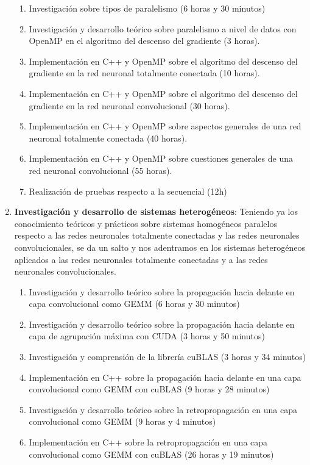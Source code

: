 \begin{enumerate}[label=\textbullet]
	\begin{enumerate}[label=\textbullet]
		\item Investigación sobre tipos de paralelismo (6 horas y 30 minutos)
		\item Investigación y desarrollo teórico sobre paralelismo a nivel de datos con OpenMP en el algoritmo del descenso del gradiente (3 horas).
		\item Implementación en C++ y OpenMP sobre el algoritmo del descenso del gradiente en la red neuronal totalmente conectada (10 horas).
		\item Implementación en C++ y OpenMP sobre el algoritmo del descenso del gradiente en la red neuronal convolucional (30 horas).
		\item Implementación en C++ y OpenMP sobre aspectos generales de una red neuronal totalmente conectada (40 horas).
		\item Implementación en C++ y OpenMP sobre cuestiones generales de una red neuronal convolucional (55 horas).
		\item Realización de pruebas respecto a la secuencial (12h)
	\end{enumerate}
	\item \textbf{Investigación y desarrollo de sistemas heterogéneos}:
	Teniendo ya los conocimiento teóricos y prácticos sobre sistemas homogéneos paralelos respecto a las redes neuronales totalmente conectadas y las redes neuronales convolucionales, se da un salto y nos adentramos en los sistemas heterogéneos aplicados a las redes neuronales totalmente conectadas y a las redes neuronales convolucionales.
	\begin{enumerate}[label=\textbullet]
		\item Investigación y desarrollo teórico sobre la propagación hacia delante en capa convolucional como GEMM (6 horas y 30 minutos)
		\item Investigación y desarrollo teórico sobre la propagación hacia delante en capa de agrupación máxima con CUDA (3 horas y 50 minutos)
		\item Investigación y comprensión de la librería cuBLAS (3 horas y 34 minutos)
		\item Implementación en C++ sobre la propagación hacia delante en una capa convolucional como GEMM con cuBLAS (9 horas y 28 minutos)
		\item Investigación y desarrollo teórico sobre la retropropagación en una capa convolucional como GEMM (9 horas y 4 minutos)
		\item Implementación en C++ sobre la retropropagación en una capa convolucional como GEMM con cuBLAS (26 horas y 19 minutos)

\end{enumerate}
\end{enumerate}
